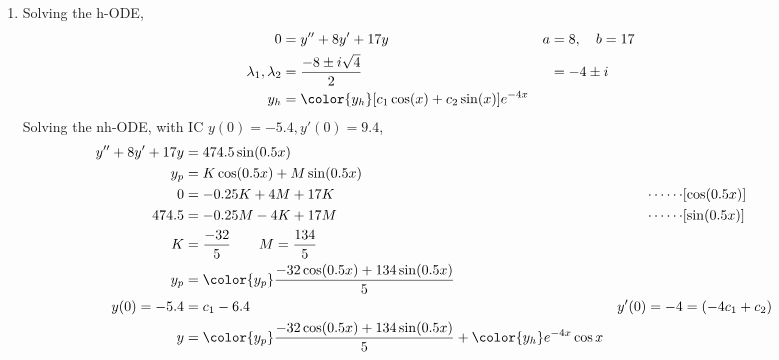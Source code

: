 \begin{enumerate}
          \begin{figure}[H]
              \centering
          \end{figure}

    \item Solving the h-ODE,
          \begin{align}
              0                        & = y'' + 8y' + 17y            &
              a                        & = 8, \quad b = 17              \\
              \lambda_{1}, \lambda_{2} & = \frac{-8 \pm i\sqrt{4}}{2} &
                                       & = -4 \pm i                     \\
              y_{h}                    & = \color{y_h} [c_{1}\cos(x)
                  + c_{2}\sin(x)]e^{-4x}
          \end{align}
          Solving the nh-ODE, with IC $ y(0) = -5.4, y'(0) = 9.4 $,
          \begin{align}
              y'' + 8y' + 17y & = 474.5\sin(0.5x)                          \\
              y_{p}           & = K\cos(0.5x) + M\sin(0.5x)                \\
              0               & = -0.25K + 4M + 17K                      &
              \cdots\cdots    & [\cos(0.5x)]                               \\
              474.5           & = -0.25M - 4K + 17M                      &
              \cdots\cdots    & [\sin(0.5x)]                               \\
              K               & = \frac{-32}{5} \qquad M = \frac{134}{5}   \\
              y_{p}           & = \color{y_p} \frac{-32\cos(0.5x)
              + 134\sin(0.5x)}{5}                                          \\
              y(0) = -5.4     & = c_{1} - 6.4                            &
              y'(0) = -4      & = (-4c_{1} + c_{2})                        \\
              y               & = {\color{y_p} \frac{-32\cos(0.5x)
                  + 134\sin(0.5x)}{5}} + {\color{y_h} e^{-4x}\cos x}
          \end{align}


\end{enumerate}
